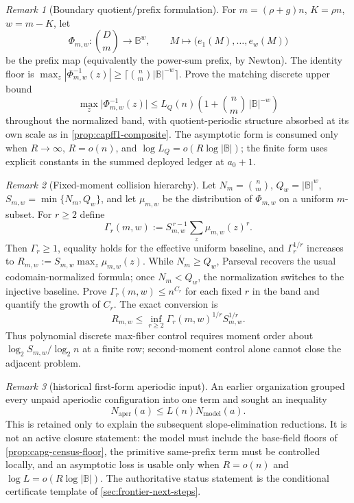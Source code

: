 \documentclass[11pt]{article}
\theoremstyle{definition}
\theoremstyle{remark}
\newtheorem{remark}[remark]{Remark}
\newcommand{\B}{\mathbb{B}}
\begin{document}
\begin{remark}[Boundary quotient/prefix formulation]\label{prob:capfp-Q}
For $m=(\rho+g)n$, $K=\rho n$, $w=m-K$, let
\[
        \Phi_{m,w}:\binom Dm\to\B^w,\qquad M\mapsto\bigl(e_1(M),\ldots,e_w(M)\bigr)
\]
be the prefix map \textup(equivalently the power-sum prefix, by Newton\textup).
The identity floor is
$\max_z|\Phi_{m,w}^{-1}(z)|\ge\lceil\binom nm|\B|^{-w}\rceil$.  Prove the
matching discrete upper bound
\[
        \max_z\bigl|\Phi_{m,w}^{-1}(z)\bigr|
        \le L_Q(n)\left(1+\binom nm\,|\B|^{-w}\right)
\]
throughout the normalized band, with quotient-periodic structure absorbed at
its own scale as in \cref{prop:capff1-composite}.  The asymptotic form is
consumed only when $R\to\infty$, $R=o(n)$, and $\log L_Q=o(R\log|\B|)$; the finite form uses explicit
constants in the summed deployed ledger at $a_0+1$.
\end{remark}

\begin{remark}[Fixed-moment collision hierarchy]\label{prob:capfp-gamma}
Let $N_m=\binom nm$, $Q_w=|\B|^w$, $S_{m,w}=\min\{N_m,Q_w\}$, and let
$\mu_{m,w}$ be the distribution of $\Phi_{m,w}$ on a uniform $m$-subset.  For
$r\ge2$ define
\[
        \Gamma_r(m,w):=S_{m,w}^{\,r-1}\sum_z\mu_{m,w}(z)^r.
\]
Then $\Gamma_r\ge1$, equality holds for the effective uniform baseline, and
$\Gamma_r^{1/r}$ increases to
$R_{m,w}:=S_{m,w}\max_z\mu_{m,w}(z)$.  While $N_m\ge Q_w$, Parseval recovers the
usual codomain-normalized formula; once $N_m<Q_w$, the normalization switches
to the injective baseline.  Prove $\Gamma_r(m,w)\le n^{C_r}$ for each fixed
$r$ in the band and quantify the growth of $C_r$.  The exact conversion is
\[
        R_{m,w}\le \inf_{r\ge2}\Gamma_r(m,w)^{1/r}S_{m,w}^{1/r}.
\]
Thus polynomial discrete max-fiber control requires moment order about
$\log_2S_{m,w}/\log_2n$ at a finite row; second-moment control alone cannot
close the adjacent problem.
\end{remark}

\begin{remark}[historical first-form aperiodic input]\label{prob:capfp-A}
An earlier organization grouped every unpaid aperiodic configuration into one term and sought an inequality
\[
        N_{\mathrm{aper}}(a)\le L(n)N_{\mathrm{model}}(a).
\]
This is retained only to explain the subsequent slope-elimination reductions.  It is not an active closure statement: the model must include the base-field floors of \cref{prop:capg-census-floor}, the primitive same-prefix term must be controlled locally, and an asymptotic loss is usable only when $R=o(n)$ and $\log L=o(R\log|\B|)$.  The authoritative status statement is the conditional certificate template of \cref{sec:frontier-next-steps}.
\end{remark}
\end{document}
